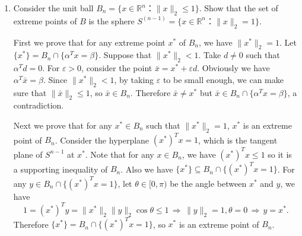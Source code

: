 \documentclass[11pt]{article}
\institute{\'Ecole Polytechnique F\'ed\'erale de Lausanne}
\newcommand{\setR}{\mathbb{R}}
\renewcommand{\leq}{\leqslant}
\begin{document}
\makeheader

\begin{enumerate}[1)]

\item  \label{item:ex-9}
  Consider the unit ball $B_n = \{ x ∈ ℝ^n ： \|x\|_2≤1\}$. Show that the set of extreme points of $B$ is the sphere $S^{(n-1)} = \{ x ∈ ℝ^n ： \|x\|_2 =1\}$.
  
  \begin{solution}
  First we prove that for any extreme point $x^*$ of $B_n$, we have $\|x^*\|_2=1$. Let $\{x^*\} = B_n \cap \{\alpha^T x= \beta\}$. Suppose that $\|x^*\|_2<1$. Take $d\neq 0$ such that $\alpha^T d = 0$. For $\varepsilon> 0$, consider the point $\bar{x} = x^* + \varepsilon d$. Obviously we have $\alpha^T \bar{x} = \beta$. Since $\|x^*\|_2<1$, by taking $\varepsilon$ to be small enough, we can make sure that $\|\bar{x}\|_2\leq 1$, so $\bar{x} \in B_n$. Therefore $\bar{x} \neq x^*$ but $\bar{x} \in B_n \cap \{\alpha^T x= \beta\}$, a contradiction.

  Next we prove that for any $x^* \in B_n$ such that $\|x^*\|_2=1$, $x^*$ is an extreme point of $B_n$. Consider the hyperplane $(x^*)^T x = 1$, which is the tangent plane of $S^{n-1}$ at $x^*$. Note that for any $x \in B_n$, we have $(x^*)^T x \leq 1$ so it is a supporting inequality of $B_n$. Also we have $\{x^*\} \subseteq B_n \cap \{(x^*)^T x = 1\}$. For any $y \in B_n \cap \{(x^*)^T x = 1\}$, let $\theta\in [0,\pi)$ be the angle between $x^*$ and $y$, we have
  \[ 1=(x^*)^T y = \|x^*\|_2 \|y\|_2 \cos\theta \leq 1 \,\Rightarrow\, \|y\|_2 = 1, \theta = 0 \,\Rightarrow\, y = x^*. \]
  Therefore $\{x^*\} = B_n \cap \{(x^*)^T x = 1\}$, so $x^*$ is an extreme point of $B_n$.
  \end{solution}


  




\end{enumerate}
\end{document}
